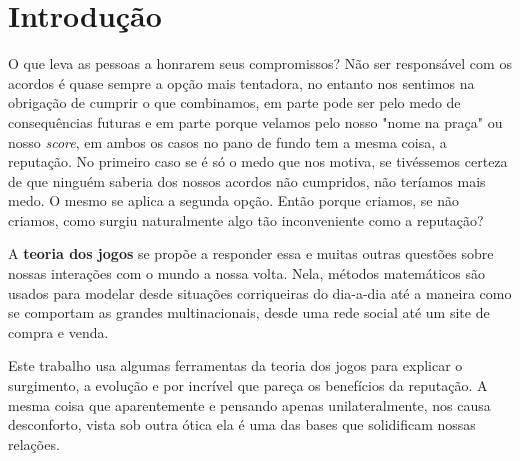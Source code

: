 %


\setcounter{page}{10}

\chapter*{Introdução}

O que leva as pessoas a honrarem seus compromissos? Não ser responsável com os acordos é quase sempre a opção mais tentadora, no entanto nos sentimos na obrigação de cumprir o que combinamos, em parte pode ser pelo medo de consequências futuras e em parte porque velamos pelo nosso "nome na praça" ou nosso \textit{score}, em ambos os casos no pano de fundo tem a mesma coisa, a reputação. No primeiro caso se é só o medo que nos motiva, se tivéssemos certeza de que ninguém saberia dos nossos acordos não cumpridos, não teríamos mais medo. O mesmo se aplica a segunda opção. Então porque criamos, se não criamos, como surgiu naturalmente algo tão inconveniente como a reputação?

A \textbf{teoria dos jogos} se propõe a responder essa e muitas outras questões sobre nossas interações com o mundo a nossa volta. Nela, métodos matemáticos são usados para modelar desde situações corriqueiras do dia-a-dia até a maneira como se comportam as grandes multinacionais, desde uma rede social até um site de compra e venda.

Este trabalho usa algumas ferramentas da teoria dos jogos para explicar o surgimento, a evolução e por incrível que pareça os benefícios da reputação. A mesma coisa que aparentemente e pensando apenas unilateralmente, nos causa desconforto, vista sob outra ótica ela é uma das bases que solidificam nossas relações.

%